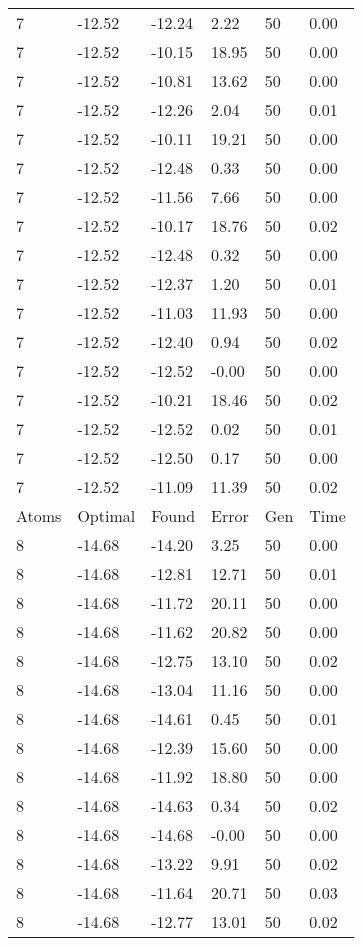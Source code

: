 \documentclass{report}
\begin{document}
\begin{appendix}
\begin{longtable}{llllll}
7 & -12.52 & -12.24 & 2.22 & 50 & 0.00 \\
7 & -12.52 & -10.15 & 18.95 & 50 & 0.00 \\
7 & -12.52 & -10.81 & 13.62 & 50 & 0.00 \\
7 & -12.52 & -12.26 & 2.04 & 50 & 0.01 \\
7 & -12.52 & -10.11 & 19.21 & 50 & 0.00 \\
7 & -12.52 & -12.48 & 0.33 & 50 & 0.00 \\
7 & -12.52 & -11.56 & 7.66 & 50 & 0.00 \\
7 & -12.52 & -10.17 & 18.76 & 50 & 0.02 \\
7 & -12.52 & -12.48 & 0.32 & 50 & 0.00 \\
7 & -12.52 & -12.37 & 1.20 & 50 & 0.01 \\
7 & -12.52 & -11.03 & 11.93 & 50 & 0.00 \\
7 & -12.52 & -12.40 & 0.94 & 50 & 0.02 \\
7 & -12.52 & -12.52 & -0.00 & 50 & 0.00 \\
7 & -12.52 & -10.21 & 18.46 & 50 & 0.02 \\
7 & -12.52 & -12.52 & 0.02 & 50 & 0.01 \\
7 & -12.52 & -12.50 & 0.17 & 50 & 0.00 \\
7 & -12.52 & -11.09 & 11.39 & 50 & 0.02 \\
Atoms & Optimal & Found & Error & Gen & Time \\
8 & -14.68 & -14.20 & 3.25 & 50 & 0.00 \\
8 & -14.68 & -12.81 & 12.71 & 50 & 0.01 \\
8 & -14.68 & -11.72 & 20.11 & 50 & 0.00 \\
8 & -14.68 & -11.62 & 20.82 & 50 & 0.00 \\
8 & -14.68 & -12.75 & 13.10 & 50 & 0.02 \\
8 & -14.68 & -13.04 & 11.16 & 50 & 0.00 \\
8 & -14.68 & -14.61 & 0.45 & 50 & 0.01 \\
8 & -14.68 & -12.39 & 15.60 & 50 & 0.00 \\
8 & -14.68 & -11.92 & 18.80 & 50 & 0.00 \\
8 & -14.68 & -14.63 & 0.34 & 50 & 0.02 \\
8 & -14.68 & -14.68 & -0.00 & 50 & 0.00 \\
8 & -14.68 & -13.22 & 9.91 & 50 & 0.02 \\
8 & -14.68 & -11.64 & 20.71 & 50 & 0.03 \\
8 & -14.68 & -12.77 & 13.01 & 50 & 0.02 \\

\end{longtable}
\end{appendix}
\end{document}
